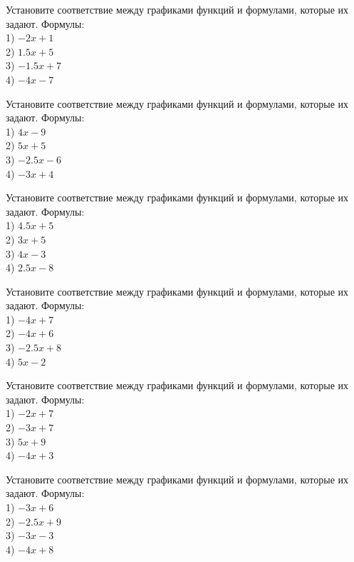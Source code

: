 \documentclass[4apaper]{article}
\begin{document}
\begin{taskBN}{55}
Установите соответствие между графиками функций и формулами, которые их задают. Формулы: \\1) $-2x+1$\\2) $1.5x+5$\\3) $-1.5x+7$\\4) $-4x-7$
\end{taskBN}

\begin{taskBN}{56}
Установите соответствие между графиками функций и формулами, которые их задают. Формулы: \\1) $4x-9$\\2) $5x+5$\\3) $-2.5x-6$\\4) $-3x+4$
\end{taskBN}

\begin{taskBN}{57}
Установите соответствие между графиками функций и формулами, которые их задают. Формулы: \\1) $4.5x+5$\\2) $3x+5$\\3) $4x-3$\\4) $2.5x-8$
\end{taskBN}

\begin{taskBN}{58}
Установите соответствие между графиками функций и формулами, которые их задают. Формулы: \\1) $-4x+7$\\2) $-4x+6$\\3) $-2.5x+8$\\4) $5x-2$
\end{taskBN}

\begin{taskBN}{59}
Установите соответствие между графиками функций и формулами, которые их задают. Формулы: \\1) $-2x+7$\\2) $-3x+7$\\3) $5x+9$\\4) $-4x+3$
\end{taskBN}

\begin{taskBN}{60}
Установите соответствие между графиками функций и формулами, которые их задают. Формулы: \\1) $-3x+6$\\2) $-2.5x+9$\\3) $-3x-3$\\4) $-4x+8$
\end{taskBN}
\end{document}
